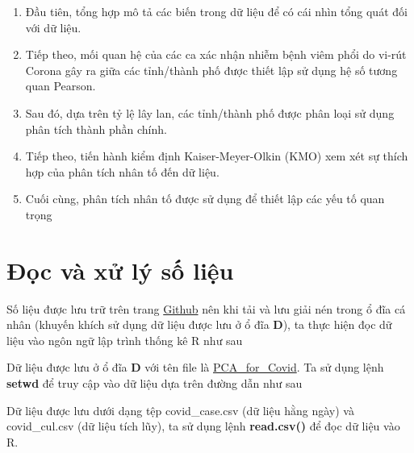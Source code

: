 \documentclass[../thesis.tex]{subfiles}
\begin{document}
\begin{enumerate}
	\item Đầu tiên, tổng hợp mô tả các biến trong dữ liệu để có cái nhìn tổng quát đối với dữ liệu.
	\item Tiếp theo, mối quan hệ của các ca xác nhận nhiễm bệnh viêm phổi do vi-rút Corona gây ra giữa các tỉnh/thành phố được thiết lập sử dụng hệ số tương quan Pearson.
	\item Sau đó, dựa trên tỷ lệ lây lan, các tỉnh/thành phố được phân loại sử dụng phân tích thành phần chính.
	\item Tiếp theo, tiến hành kiểm định Kaiser-Meyer-Olkin (KMO) xem xét sự thích hợp của phân tích nhân tố đến dữ liệu.
	\item Cuối cùng, phân tích nhân tố được sử dụng để thiết lập các yếu tố quan trọng 
\end{enumerate}

\newpage
\section{Đọc và xử lý số liệu}

Số liệu được lưu trữ trên trang \href{https://github.com/hungtrannam/PCA_for_Covid19}{Github} nên khi tải và lưu giải nén trong ổ đĩa cá nhân (khuyến khích sử dụng dữ liệu được lưu ở ổ đĩa \textbf{D}), ta thực hiện đọc dữ liệu vào ngôn ngữ lập trình thống kê R như sau

Dữ liệu được lưu ở ổ đĩa \textbf{D} với tên file là \href{https://github.com/hungtrannam/PCA_for_Covid19/tree/main/Data}{PCA\_for\_Covid}. Ta sử dụng lệnh \textbf{setwd} để truy cập vào dữ liệu dựa trên đường dẫn như sau

\begin{Shaded}
	\begin{Highlighting}[]
\NormalTok{(}\NormalTok{)}
	\end{Highlighting}
\end{Shaded}

Dữ liệu được lưu dưới dạng tệp \textsf{covid\_case.csv} (dữ liệu hằng ngày) và \textsf{covid\_cul.csv} (dữ liệu tích lũy), ta sử dụng lệnh \textbf{read.csv()} để đọc dữ liệu vào R.

\begin{Shaded}
	\begin{Highlighting}[]
\OtherTok{\textless{}{-}} \NormalTok{(}\NormalTok{, }
		 \NormalTok{,}
		 \NormalTok{, }
		 \NormalTok{)}
\OtherTok{\textless{}{-}} \NormalTok{(}\NormalTok{, }
		 \NormalTok{,}
		 \NormalTok{)}
	\end{Highlighting}
\end{Shaded}
\end{document}
